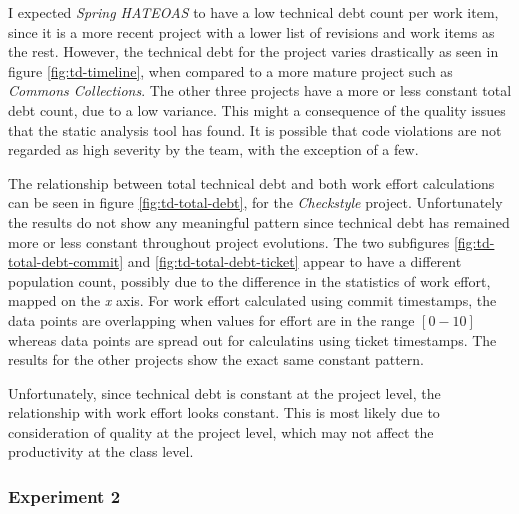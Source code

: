 \documentclass{mpaper}
\begin{document}
I expected \emph{Spring HATEOAS} to have a low technical debt count per work
item, since it is a more recent project with a lower list of revisions and work
items as the rest. However, the technical debt for the project varies
drastically as seen in figure \ref{fig:td-timeline}, when compared to a more
mature project such as \emph{Commons Collections}. The other three projects have
a more or less constant total debt count, due to a low variance. This might a
consequence of the quality issues that the static analysis tool has found. It is
possible that code violations are not regarded as high severity by the team,
with the exception of a few. 

The relationship between total technical debt and both work effort calculations
can be seen in figure \ref{fig:td-total-debt}, for the \emph{Checkstyle}
project. Unfortunately the results do not show any meaningful pattern since
technical debt has remained more or less constant throughout project evolutions.
The two subfigures \ref{fig:td-total-debt-commit} and
\ref{fig:td-total-debt-ticket} appear to have a different population count,
possibly due to the difference in the statistics of work effort, mapped on the
\emph{x} axis. For work effort calculated using commit timestamps, the data
points are overlapping when values for effort are in the range $[0-10]$ whereas
data points are spread out for calculatins using ticket timestamps. The results
for the other projects show the exact same constant pattern. 

Unfortunately, since technical debt is constant at the project level, the
relationship with work effort looks constant. This is most likely due to
consideration of quality at the project level, which may not affect the
productivity at the class level. 

\subsubsection*{Experiment 2}
\label{experiment-2}
\end{document}
